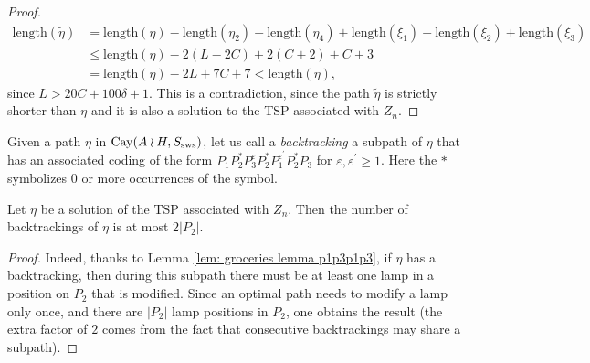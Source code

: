 \begin{proof}
\begin{align*}
	\mathrm{length}(\widetilde{\eta})&=\mathrm{length}(\eta)-\mathrm{length}(\eta_2)-\mathrm{length}(\eta_4)+\mathrm{length}(\xi_1)+\mathrm{length}(\xi_2)+\mathrm{length}(\xi_3)\\
	&\le \mathrm{length}(\eta) - 2(L-2C)+2(C+2)+C+3\\
	&= \mathrm{length}(\eta) - 2L+7C +7<\mathrm{length}(\eta),
	\end{align*}
	since $L>20C+100\delta+1$. This is a contradiction, since the path $\widetilde{\eta}$ is strictly shorter than $\eta$ and it is also a solution to the TSP associated with $Z_n$.
%	
%	
\end{proof}
\begin{defin}
	Given a path $\eta$ in $\mathrm{Cay}(A\wr H,S_{\mathrm{sws}})$, let us call a \emph{backtracking} a subpath of $\eta$ that has an associated coding of the form $P_1P_2^{*}P_3^{\varepsilon}P_2^{*}P_1^{\varepsilon^{\prime}}P_2^{*}P_3$ for $\varepsilon, \varepsilon^{\prime}\ge 1$. Here the $*$ symbolizes $0$ or more occurrences of the symbol.
\end{defin}


\begin{lem}\label{lem: number of backtrackings}
	Let $\eta$ be a solution of the TSP associated with $Z_n$. Then the number of backtrackings of $\eta$ is at most $2|P_2|$.
\end{lem}
\begin{proof}
	Indeed, thanks to Lemma \ref{lem: groceries lemma p1p3p1p3}, if $\eta$ has a backtracking, then during this subpath there must be at least one lamp in a position on $P_2$ that is modified. Since an optimal path needs to modify a lamp only once, and there are $|P_2|$ lamp positions in $P_2$, one obtains the result (the extra factor of $2$ comes from the fact that consecutive backtrackings may share a subpath).
%	
\end{proof}

